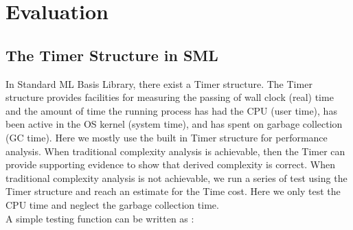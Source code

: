 \documentclass[12pt,twoside,notitlepage]{report}
\begin{document}

\cleardoublepage
\chapter{Evaluation}
\section{The Timer Structure in SML}
In Standard ML Basis Library, there exist a Timer structure. The Timer structure provides facilities for measuring the passing of wall clock (real) time and the amount of time the running process has had the CPU (user time), has been active in the OS kernel (system time), and has spent on garbage collection (GC time). Here we mostly use the built in Timer structure for performance analysis. When traditional complexity analysis is achievable, then the Timer can provide supporting evidence to show that derived complexity is correct. When traditional complexity analysis is not achievable, we run a series of test using the Timer structure and reach an estimate for the Time cost. Here we only test the CPU time and neglect the garbage collection time.\\
A simple testing function can be written as :
\end{document}

